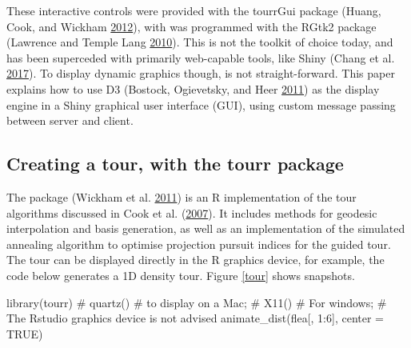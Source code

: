 These interactive controls were provided with the tourrGui package
(Huang, Cook, and Wickham \protect\hyperlink{ref-tourrGui}{2012}), with
was programmed with the RGtk2 package (Lawrence and Temple Lang
\protect\hyperlink{ref-RGtk2}{2010}). This is not the toolkit of choice
today, and has been superceded with primarily web-capable tools, like
Shiny (Chang et al. \protect\hyperlink{ref-shiny}{2017}). To display
dynamic graphics though, is not straight-forward. This paper explains
how to use D3 (Bostock, Ogievetsky, and Heer
\protect\hyperlink{ref-D3}{2011}) as the display engine in a Shiny
graphical user interface (GUI), using custom message passing between
server and client.

\hypertarget{creating-a-tour-with-the-tourr-package}{%
\subsection{Creating a tour, with the tourr
package}\label{creating-a-tour-with-the-tourr-package}}

The  package (Wickham et al.
\protect\hyperlink{ref-tourr}{2011}) is an R implementation of the tour
algorithms discussed in Cook et al.
(\protect\hyperlink{ref-gt_pp_mc}{2007}). It includes methods for
geodesic interpolation and basis generation, as well as an
implementation of the simulated annealing algorithm to optimise
projection pursuit indices for the guided tour. The tour can be
displayed directly in the R graphics device, for example, the code below
generates a 1D density tour. Figure \ref{tour} shows snapshots.

\begin{Schunk}
\begin{Sinput}
library(tourr)
# quartz() # to display on a Mac;
# X11() # For windows;
# The Rstudio graphics device is not advised
animate_dist(flea[, 1:6], center = TRUE)
\end{Sinput}
\end{Schunk}

